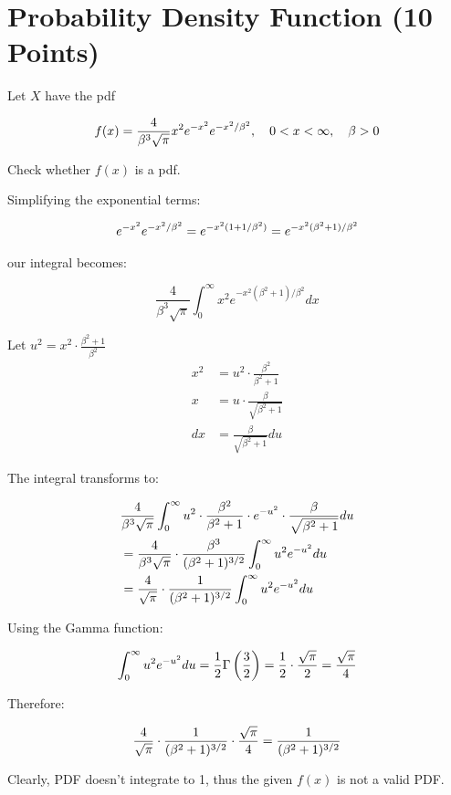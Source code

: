 \documentclass[12pt, xcolor=dvipsnames,svgnames,x11names]{article}
\makeatletter
\newenvironment{multiequation}[1][]{%
\begin{equation}%
   \begin{aligned}%
   \ifx#1\@empty\else\label{#1}\fi%
}{%
   \end{aligned}%
\end{equation}%
}
\makeatother
\begin{document}
\section{Probability Density Function (10 Points)}

Let $X$ have the pdf 

\begin{multiequation}
f(x) = \frac{4}{\beta^3 \sqrt{\pi}} x^2 e^{-x^2} e^{-x^2/\beta^2}, \quad 0  < x < \infty, \quad \beta > 0
\end{multiequation}

Check whether $f(x)$ is a pdf.

\begin{answerbox}

Simplifying the exponential terms:

\begin{multiequation}
e^{-x^2} e^{-x^2/\beta^2} = e^{-x^2(1 + 1/\beta^2)} = e^{-x^2(\beta^2 + 1)/\beta^2}
\end{multiequation}

our integral becomes:

$$
\frac{4}{\beta^3 \sqrt{\pi}} \int_0^{\infty} x^2 e^{-x^2(\beta^2 + 1)/\beta^2} dx
$$

Let  $u^2 = x^2 \cdot \frac{\beta^2 + 1}{\beta^2}$
\begin{align}
x^2 &= u^2 \cdot \frac{\beta^2}{\beta^2 + 1}\\
x &= u \cdot \frac{\beta}{\sqrt{\beta^2 + 1}}\\
dx &= \frac{\beta}{\sqrt{\beta^2 + 1}} du
\end{align}

The integral transforms to:

\begin{multiequation}
& \frac{4}{\beta^3 \sqrt{\pi}} \int_0^{\infty} u^2 \cdot \frac{\beta^2}{\beta^2 + 1} \cdot e^{-u^2} \cdot \frac{\beta}{\sqrt{\beta^2 + 1}} du\\
& = \frac{4}{\beta^3 \sqrt{\pi}} \cdot \frac{\beta^3}{(\beta^2 + 1)^{3/2}} \int_0^{\infty} u^2 e^{-u^2} du\\
& = \frac{4}{\sqrt{\pi}} \cdot \frac{1}{(\beta^2 + 1)^{3/2}} \int_0^{\infty} u^2 e^{-u^2} du
\end{multiequation}

Using the Gamma function:


\begin{multiequation}
\int_0^{\infty} u^2 e^{-u^2} du = \frac{1}{2}\Gamma\left(\frac{3}{2}\right) = \frac{1}{2} \cdot \frac{\sqrt{\pi}}{2} = \frac{\sqrt{\pi}}{4}
\end{multiequation}

Therefore:

\begin{multiequation}
\frac{4}{\sqrt{\pi}} \cdot \frac{1}{(\beta^2 + 1)^{3/2}} \cdot \frac{\sqrt{\pi}}{4} = \frac{1}{(\beta^2 + 1)^{3/2}}
\end{multiequation}

Clearly, PDF doesn't integrate to 1, thus the given $f(x)$ is not a valid PDF.

\end{answerbox}
\end{document}
